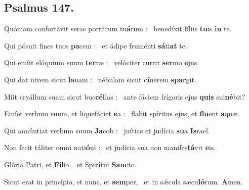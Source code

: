 \documentclass[12pt]{article} %
\newenvironment{psalmtext}{\leftskip 0.25in}{\vspace{2 mm}}
\let\oldgresixstar\gresixstar
\renewcommand{\gresixstar}{\textcolor{benred8}{\oldgresixstar}}
\let\oldAbar\Abar
\renewcommand{\Abar}{\textcolor{benred8}{\oldAbar .}}
\begin{document}
\vspace{2 mm}


\subsection*{}


\gresetfirstlineaboveinitial{\small \textsc{ \textbf{\textcolor{benred8}{5 \Abar\ E}}}}{\small \textsc{ \textbf{\textcolor{benred8}{5 \Abar\ E}}}}

\subsection*{Psalmus 147.}

\begin{psalmtext}
Quóniam confortávit seras portárum tu\textbf{á}rum : \gresixstar\ benedíxit fíliis \textbf{tu}is \textbf{in} te.

Qui pósuit fines tuos \textbf{pa}cem : \gresixstar\ et ádipe fruménti \textbf{sá}ti\textbf{at} te.

Qui emíit elóquium suum \textbf{ter}ræ : \gresixstar\ velóciter currit \textbf{ser}mo \textbf{e}jus.

Qui dat nivem sicut \textbf{la}nam : \gresixstar\ nébulam sicut \textbf{cí}nerem \textbf{spar}git.

Miit cryállum suam sicut buc\textbf{cél}las : \gresixstar\ ante fáciem frígoris ejus \textbf{quis} sui\textbf{né}bit?

Emíet verbum suum, et liquefáciet \textbf{e}a : \gresixstar\ flabit spíritus ejus, et \textbf{flu}ent \textbf{a}quæ.

Qui annúntiat verbum suum \textbf{Ja}cob : \gresixstar\ juítias et judícia \textbf{su}a \textbf{Is}rael.

Non fecit táliter omni nati\textbf{ó}ni : \gresixstar\ et judícia sua non manifes\textbf{tá}vit \textbf{e}is.

Glória Patri, et \textbf{Fí}lio, \gresixstar\ et Spi\textbf{rí}tui \textbf{Sanc}to.

Sicut erat in princípio, et nunc, et \textbf{sem}per, \gresixstar\ et in sǽcula sæcu\textbf{ló}rum. \textbf{A}men.

\end{psalmtext}
\end{document}
